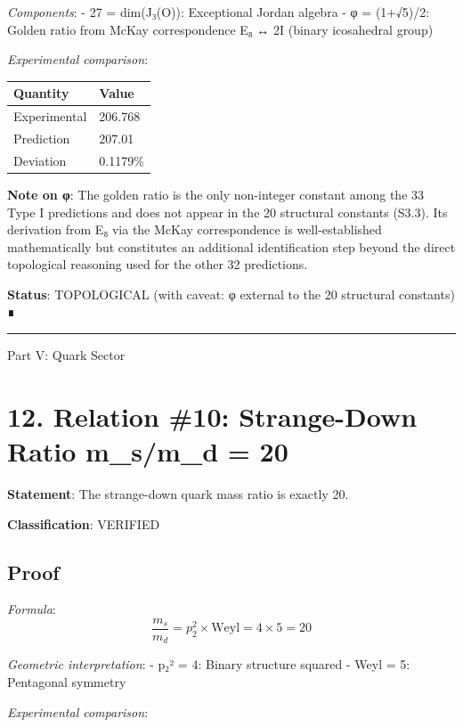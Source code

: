 \documentclass[11pt,a4paper]{article}
\begin{document}
\emph{Components}: - 27 = dim(J₃(O)): Exceptional Jordan algebra - φ = (1+√5)/2: Golden ratio from McKay correspondence E₈ ↔ 2I (binary icosahedral group)

\emph{Experimental comparison}:

\begin{longtable}[]{@{}ll@{}}
\toprule\noalign{}
Quantity & Value \\
\midrule\noalign{}
\endhead
\bottomrule\noalign{}
\endlastfoot
Experimental & 206.768 \\
Prediction & 207.01 \\
Deviation & 0.1179\% \\
\end{longtable}

\textbf{Note on φ}: The golden ratio is the only non-integer constant among the 33 Type I predictions and does not appear in the 20 structural constants (S3.3). Its derivation from E₈ via the McKay correspondence is well-established mathematically but constitutes an additional identification step beyond the direct topological reasoning used for the other 32 predictions.

\textbf{Status}: TOPOLOGICAL (with caveat: φ external to the 20 structural constants) ∎

\begin{center}\rule{\linewidth}{0.5pt}\end{center}

Part V: Quark Sector

\section{12. Relation \#10: Strange-Down Ratio m\_\allowbreak{}s/m\_\allowbreak{}d = 20}\label{relation-10-strange-down-ratio-m_sm_d-20}

\textbf{Statement}: The strange-down quark mass ratio is exactly 20.

\textbf{Classification}: VERIFIED

\subsection{Proof}\label{proof-8}

\emph{Formula}: \[\frac{m_s}{m_d} = p_2^2 \times \text{Weyl} = 4 \times 5 = 20\]

\emph{Geometric interpretation}: - p₂² = 4: Binary structure squared - Weyl = 5: Pentagonal symmetry

\emph{Experimental comparison}:
\end{document}
